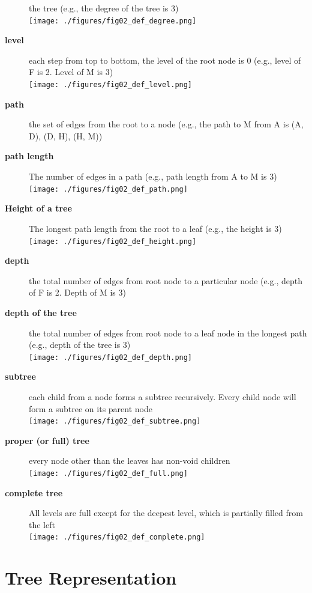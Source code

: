 \documentclass[newPxFont,sthlmFooter,nooffset]{beamer}
\begin{document}
\begin{frame}[t, allowframebreaks]
\begin{description}
    the tree (e.g., the degree of the tree is 3)\\
\texttt{[image: ./figures/fig02\_def\_degree.png]}
  \item[\textbf{level}] each step from top to bottom, the level of the
    root node is 0 (e.g., level of F is 2. Level of M is 3)\\
\texttt{[image: ./figures/fig02\_def\_level.png]}
  \item[\textbf{path}] the set of edges from the root to a node (e.g.,
    the path to M from A is (A, D), (D, H), (H, M))
  \item[\textbf{path length}] The number of edges in a path (e.g.,
    path length from A to M is 3)\\
\texttt{[image: ./figures/fig02\_def\_path.png]}
  \item[\textbf{Height of a tree}] The longest path length from the
    root to a leaf (e.g., the height is 3)\\
\texttt{[image: ./figures/fig02\_def\_height.png]}
\newpage  \item[\textbf{depth}] the total number of edges from root node to a
    particular node (e.g., depth of F is 2. Depth of M is 3)
  \item[\textbf{depth of the tree}] the total number of edges from
    root node to a leaf node in the longest path (e.g., depth of the
    tree is 3)\\
\texttt{[image: ./figures/fig02\_def\_depth.png]}
  \item[\textbf{subtree}] each child from a node forms a subtree
    recursively. Every child node will form a subtree on its parent
    node\\
\texttt{[image: ./figures/fig02\_def\_subtree.png]}
\item[\textbf{proper (or full) tree}] every node other than the leaves has non-void children\\
\texttt{[image: ./figures/fig02\_def\_full.png]}
\item[\textbf{complete tree}] All levels are full except for the deepest level, which is partially filled from the left\\
\texttt{[image: ./figures/fig02\_def\_complete.png]}
  \end{description}
\end{frame}

\section{Tree Representation}
\end{document}
